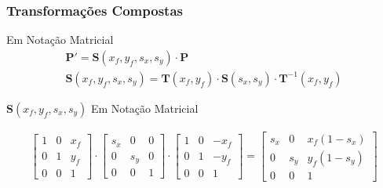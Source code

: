 \documentclass{beamer}
\begin{document}
\begin{frame}
\frametitle{Transformações Compostas}
		
		\begin{block}{Em Notação Matricial }
		\begin{eqnarray*}
			\textbf{P}' = \textbf{S}(x_f,y_f,s_x,s_y) \cdot \textbf{P} \\
			\textbf{S}(x_f,y_f,s_x,s_y) = \textbf{T}(x_f,y_f) \cdot \textbf{S}(s_x,s_y) \cdot \textbf{T}^{-1}(x_f,y_f)
		\end{eqnarray*}
		\end{block}		
		
		\begin{block}{$\textbf{S}(x_f,y_f,s_x,s_y)$ Em Notação Matricial }
		
		\begin{eqnarray*}
			\begin{bmatrix}
					1	& 0 	& x_f \\
					0 	& 1	& y_f \\
					0	& 0	& 1
			\end{bmatrix}
			\cdot \begin{bmatrix}
					s_x	& 0 		& 0 \\
					0 	& s_y	& 0 \\
					0	& 0		& 1
			\end{bmatrix}
			\cdot \begin{bmatrix}
					1	& 0 	& -x_f \\
					0 	& 1	& -y_f \\
					0	& 0	& 1
			\end{bmatrix}
			=  \begin{bmatrix}
					s_x	& 0 		& x_f(1-s_x) \\
					0 	& s_y	& y_f(1-s_y) \\
					0	& 0		& 1
			\end{bmatrix}
		\end{eqnarray*}
	\end{block}
		
\end{frame}	
\end{document}
